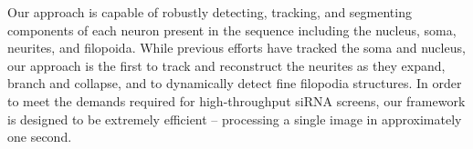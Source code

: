 Our approach   is  capable  of  robustly   detecting,  tracking,  and
segmenting components of each neuron present in the sequence including
the nucleus,  soma, neurites,  and filopoida.  While  previous efforts
have tracked the soma and nucleus,  our approach is the first to track
and reconstruct the neurites as  they expand, branch and collapse, and
to dynamically detect fine filopodia structures.  In order to meet the
demands required  for high-throughput siRNA screens,  our framework is
designed to  be extremely  efficient -- processing  a single  image in
approximately one second.
